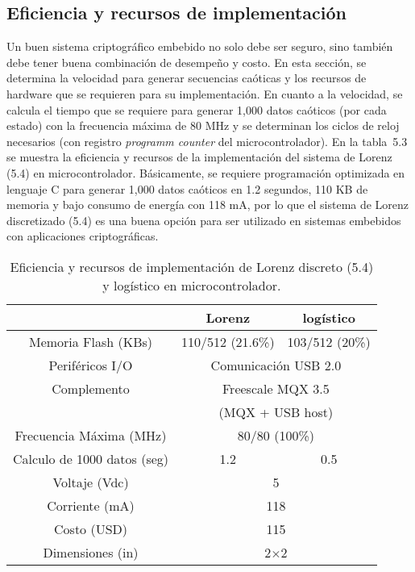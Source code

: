 \subsection{Eficiencia y recursos de implementación}
Un buen sistema criptográfico embebido no solo debe ser seguro, sino también debe tener buena combinación de desempeño y costo. En esta sección, se determina la velocidad para generar secuencias caóticas y los recursos de hardware que se requieren para su implementación. En cuanto a la velocidad, se calcula el tiempo que se requiere para generar 1,000 datos caóticos (por cada estado) con la frecuencia máxima de 80 MHz y se determinan los ciclos de reloj necesarios (con registro \textit{programm counter} del microcontrolador). En la tabla~5.3 se muestra la eficiencia y recursos de la implementación del sistema de Lorenz (5.4) en microcontrolador. Básicamente, se requiere programación optimizada en lenguaje C para generar 1,000 datos caóticos en 1.2 segundos, 110 KB de memoria y bajo consumo de energía con 118 mA, por lo que el sistema de Lorenz discretizado (5.4) es una buena opción para ser utilizado en sistemas embebidos con aplicaciones criptográficas.  

\begin{table}[!htbp] %
	\center
	\begin{tabular}{c c c}
	\hline
								&	      Lorenz			&		logístico  \\
	\hline
		Memoria Flash (KBs)		&	    110/512	 (21.6\%)	&	103/512	 (20\%) 	\\
		Periféricos I/O			&	\multicolumn{2}{c}{Comunicación USB 2.0}	\\
		Complemento				&	\multicolumn{2}{c}{Freescale MQX 3.5}		\\
								&		\multicolumn{2}{c}{(MQX + USB host)}	 \\
		Frecuencia Máxima (MHz)	&		\multicolumn{2}{c}{80/80  (100\%)}		 \\
		Calculo de 1000 datos (seg)	&		1.2				&		0.5			\\		
		Voltaje (Vdc)			&		\multicolumn{2}{c}{5}	\\
		Corriente (mA)			&		\multicolumn{2}{c}{118}	\\
		Costo  (USD)			&		\multicolumn{2}{c}{115}	\\
		Dimensiones (in)		&		\multicolumn{2}{c}{2$\times$2}	\\
	\hline
\end{tabular}
	\caption{Eficiencia y recursos de implementación de Lorenz discreto (5.4) y logístico en microcontrolador.}
\end{table}


